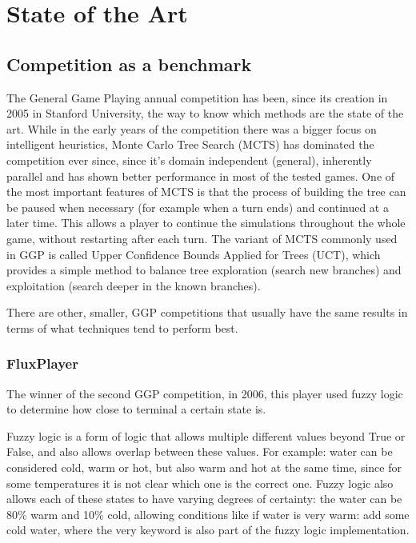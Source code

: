 \chapter{State of the Art}
\label{chapter:state_of_the_art}

\section{Competition as a benchmark}
The General Game Playing annual competition has been, since its creation in 2005 in Stanford University, the way to know which methods are the state of the art. 
While in the early years of the competition there was a bigger focus on intelligent heuristics, Monte Carlo Tree Search (MCTS) has dominated the competition ever since, since it’s domain independent (general), inherently parallel and has shown better performance in most of the tested games. One of the most important features of MCTS is that the process of building the tree can be paused when necessary (for example when a turn ends) and continued at a later time. This allows a player to continue the simulations throughout the whole game, without restarting after each turn.
The variant of MCTS commonly used in GGP is called Upper Confidence Bounds Applied for Trees (UCT), which provides a simple method to balance tree exploration (search new branches) and exploitation (search deeper in the known branches). 

There are other, smaller, \gls{GGP} competitions that usually have the same results in terms of what techniques tend to perform best.


\subsection{FluxPlayer}
The winner of the second GGP competition, in 2006, this player used fuzzy logic to determine how close to terminal a certain state is.

Fuzzy logic is a form of logic that allows multiple different values beyond True or False, and also allows overlap between these values. For example: water can be considered cold, warm or hot, but also warm and hot at the same time, since for some temperatures it is not clear which one is the correct one. Fuzzy logic also allows each of these states to have varying degrees of certainty: the water can be 80\% warm and 10\% cold, allowing conditions like if water is very warm: add some cold water, where the very keyword is also part of the fuzzy logic implementation.

